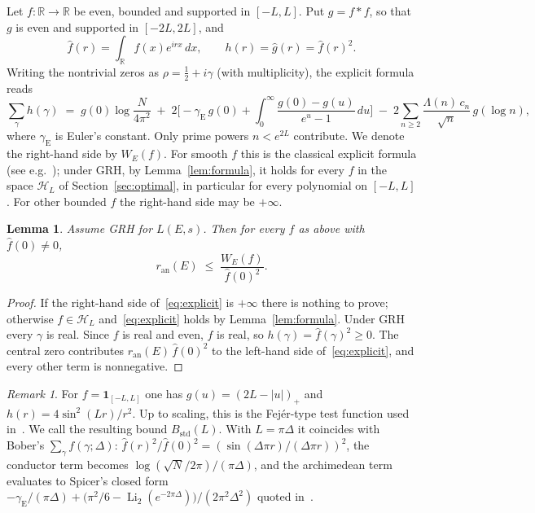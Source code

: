\documentclass[11pt]{amsart}
\newtheorem{lemma}[theorem]{Lemma}
\theoremstyle{remark}
\newtheorem{remark}[theorem]{Remark}
\theoremstyle{definition}
\newcommand{\R}{\mathbb{R}}
\newcommand{\Hs}{\mathcal{H}_L}
\newcommand{\ran}{r_{\mathrm{an}}}
\begin{document}
Let $f\colon\R\to\R$ be even, bounded and supported in $[-L,L]$. Put $g=f*f$, so that $g$ is even and supported in $[-2L,2L]$, and
\[
\hat f(r)=\int_{\R} f(x)e^{irx}\,dx,\qquad h(r)=\hat g(r)=\hat f(r)^2 .
\]
Writing the nontrivial zeros as $\rho=\tfrac12+i\gamma$ (with multiplicity), the explicit formula reads
\begin{equation}\label{eq:explicit}
\sum_{\gamma} h(\gamma) \;=\; g(0)\log\frac{N}{4\pi^2}
\;+\;2\Big[-\gamma_{\mathrm E}\,g(0)+\int_0^{\infty}\frac{g(0)-g(u)}{e^{u}-1}\,du\Big]
\;-\;2\sum_{n\ge 2}\frac{\Lambda(n)\,c_n}{\sqrt n}\,g(\log n),
\end{equation}
where $\gamma_{\mathrm E}$ is Euler's constant. Only prime powers $n<e^{2L}$ contribute. We denote the right-hand side by $W_E(f)$. For smooth $f$ this is the classical explicit formula (see e.g.~\cite[Thm.~5.12]{IK}); under GRH, by Lemma~\ref{lem:formula}, it holds for every $f$ in the space $\Hs$ of Section~\ref{sec:optimal}, in particular for every polynomial on $[-L,L]$. For other bounded $f$ the right-hand side may be $+\infty$.

\begin{lemma}\label{lem:bound}
Assume GRH for $L(E,s)$. Then for every $f$ as above with $\hat f(0)\ne0$,
\[
\ran(E)\;\le\;\frac{W_E(f)}{\hat f(0)^2}.
\]
\end{lemma}
\begin{proof}
If the right-hand side of~\eqref{eq:explicit} is $+\infty$ there is nothing to prove; otherwise $f\in\Hs$ and~\eqref{eq:explicit} holds by Lemma~\ref{lem:formula}. Under GRH every $\gamma$ is real. Since $f$ is real and even, $\hat f$ is real, so $h(\gamma)=\hat f(\gamma)^2\ge0$. The central zero contributes $\ran(E)\,\hat f(0)^2$ to the left-hand side of~\eqref{eq:explicit}, and every other term is nonnegative.
\end{proof}

\begin{remark}
For $f=\mathbf 1_{[-L,L]}$ one has $g(u)=(2L-|u|)_+$ and $h(r)=4\sin^2(Lr)/r^2$. Up to scaling, this is the Fej\'er-type test function used in~\cite{Bober,KSW}. We call the resulting bound $B_{\mathrm{std}}(L)$. With $L=\pi\Delta$ it coincides with Bober's $\sum_\gamma f(\gamma;\Delta)$: $\hat f(r)^2/\hat f(0)^2=(\sin(\Delta\pi r)/(\Delta\pi r))^2$, the conductor term becomes $\log(\sqrt N/2\pi)/(\pi\Delta)$, and the archimedean term evaluates to Spicer's closed form $-\gamma_{\mathrm E}/(\pi\Delta)+\big(\pi^2/6-\operatorname{Li}_2(e^{-2\pi\Delta})\big)/(2\pi^2\Delta^2)$ quoted in~\cite{KSW}.
\end{remark}
\end{document}

